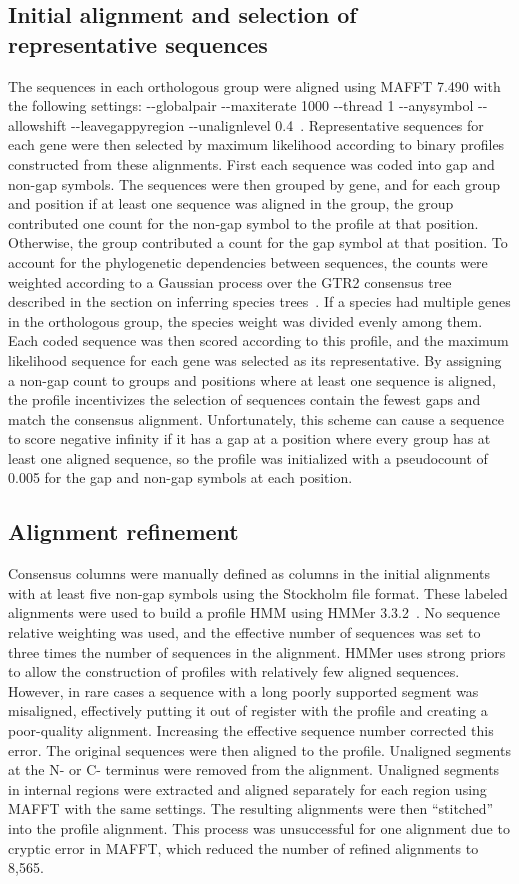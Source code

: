 \subsection*{Initial alignment and selection of representative sequences}
The sequences in each orthologous group were aligned using MAFFT 7.490 with the following settings: -{}-globalpair -{}-maxiterate 1000 -{}-thread 1 -{}-anysymbol -{}-allowshift -{}-leavegappyregion -{}-unalignlevel 0.4~\cite{Katoh2013}. Representative sequences for each gene were then selected by maximum likelihood according to binary profiles constructed from these alignments. First each sequence was coded into gap and non-gap symbols. The sequences were then grouped by gene, and for each group and position if at least one sequence was aligned in the group, the group contributed one count for the non-gap symbol to the profile at that position. Otherwise, the group contributed a count for the gap symbol at that position. To account for the phylogenetic dependencies between sequences, the counts were weighted according to a Gaussian process over the GTR2 consensus tree described in the section on inferring species trees~\cite{Altschul1989}. If a species had multiple genes in the orthologous group, the species weight was divided evenly among them. Each coded sequence was then scored according to this profile, and the maximum likelihood sequence for each gene was selected as its representative. By assigning a non-gap count to groups and positions where at least one sequence is aligned, the profile incentivizes the selection of sequences contain the fewest gaps and match the consensus alignment. Unfortunately, this scheme can cause a sequence to score negative infinity if it has a gap at a position where every group has at least one aligned sequence, so the profile was initialized with a pseudocount of 0.005 for the gap and non-gap symbols at each position.

\subsection*{Alignment refinement}
Consensus columns were manually defined as columns in the initial alignments with at least five non-gap symbols using the Stockholm file format. These labeled alignments were used to build a profile HMM using HMMer 3.3.2~\cite{Eddy2009}. No sequence relative weighting was used, and the effective number of sequences was set to three times the number of sequences in the alignment. HMMer uses strong priors to allow the construction of profiles with relatively few aligned sequences. However, in rare cases a sequence with a long poorly supported segment was misaligned, effectively putting it out of register with the profile and creating a poor-quality alignment. Increasing the effective sequence number corrected this error. The original sequences were then aligned to the profile. Unaligned segments at the N- or C- terminus were removed from the alignment. Unaligned segments in internal regions were extracted and aligned separately for each region using MAFFT with the same settings. The resulting alignments were then “stitched” into the profile alignment. This process was unsuccessful for one alignment due to cryptic error in MAFFT, which reduced the number of refined alignments to 8,565.

